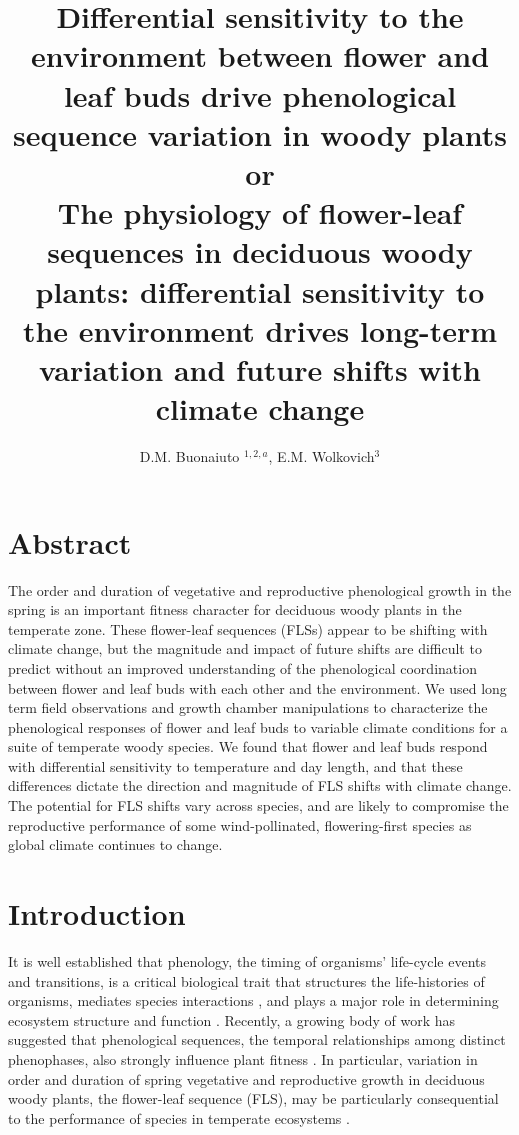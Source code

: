 \documentclass[11pt]{article}
\title{Differential sensitivity to the environment between flower and leaf buds drive phenological sequence variation in woody plants\\
or\\
The physiology of flower-leaf sequences in deciduous woody plants: differential sensitivity to the environment drives long-term variation and future shifts with climate change}
\date{}
\author{D.M. Buonaiuto $^{1,2,a}$, E.M. Wolkovich$^{3}$}
\begin{document}
\maketitle
\section*{Abstract}
The order and duration of vegetative and reproductive phenological growth in the spring is an important fitness character for deciduous woody plants in the temperate zone. These flower-leaf sequences (FLSs) appear to be shifting with climate change, but the magnitude and impact of future shifts are difficult to predict without an improved understanding of the phenological coordination between flower and leaf buds with each other and the environment. We used long term field observations and growth chamber manipulations to characterize the phenological responses of flower and leaf buds to variable climate conditions for a suite of temperate woody species. We found that flower and leaf buds respond with differential sensitivity to temperature and day length, and that these differences dictate the direction and magnitude of FLS shifts with climate change. The potential for FLS shifts vary across species, and are likely to compromise the reproductive performance of some wind-pollinated, flowering-first species as global climate continues to change.  %

\section*{Introduction}
\noindent It is well established that phenology, the timing of organisms' life-cycle events and transitions, is a critical biological trait that structures the life-histories \citep{Donohue} of organisms, mediates species interactions \citep{Gioria2018, Yang2010}, and plays a major role in determining ecosystem structure and function \citep{}. Recently, a growing body of work has suggested that phenological sequences, the temporal relationships among distinct phenophases, also strongly influence plant fitness \citep{Ettinger2018,Savage2019,Chamberlin}. In particular, variation in order and duration of spring vegetative and reproductive growth in deciduous woody plants, the flower-leaf sequence (FLS), may be particularly consequential to the performance of species in temperate ecosystems  \citep{Gougherty2018}.
\end{document}
